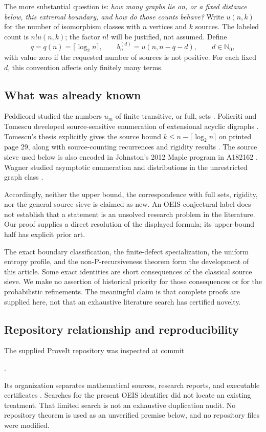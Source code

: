 \documentclass[11pt,a4paper]{article}
\theoremstyle{definition}
\newcommand{\N}{\mathbb N}
\newcommand{\code}[1]{\texttt{\detokenize{#1}}}
\begin{document}
The more substantial question is: \emph{how many graphs lie on, or a
fixed distance below, this extremal boundary, and how do those counts
behave?} Write $u(n,k)$ for the number of isomorphism classes with $n$
vertices and $k$ sources. The labeled count is $n!u(n,k)$; the factor
$n!$ will be justified, not assumed. Define
\begin{equation}\label{sbd:eq:boundary-def}
 q=q(n)=\lceil\log_2n\rceil,
 \qquad b_n^{(d)}=u(n,n-q-d),\qquad d\in\N_0,
\end{equation}
with value zero if the requested number of sources is not positive.
For each fixed $d$, this convention affects only finitely many terms.

\subsection{What was already known}
Peddicord studied the numbers $u_m$ of finite transitive, or full, sets
\cite{peddicord,oeis1192}. Policriti and Tomescu developed source-sensitive
enumeration of extensional acyclic digraphs \cite{policriti}.
Tomescu's thesis explicitly gives the source bound
$k\le n-\lceil\log_2n\rceil$ on printed page 29, along with source-counting
recurrences and rigidity results \cite{tomescu}. The source sieve used
below is also encoded in Johnston's 2012 Maple program in A182162
\cite{oeis162}. Wagner studied asymptotic enumeration and distributions
in the unrestricted graph class \cite{wagner}.

Accordingly, neither the upper bound, the correspondence with full sets,
rigidity, nor the general source sieve is claimed as new. An OEIS
conjectural label does not establish that a statement is an unsolved
research problem in the literature. Our proof supplies a direct resolution
of the displayed formula; its upper-bound half has explicit prior art.

The exact boundary classification, the finite-defect specialization,
the uniform entropy profile, and the non-P-recursiveness theorem form
the development of this article. Some exact identities are short
consequences of the classical source sieve. We make no assertion of
historical priority for those consequences or for the probabilistic
refinements. The meaningful claim is that complete proofs are supplied
here, not that an exhaustive literature search has certified novelty.

\subsection{Repository relationship and reproducibility}
The supplied ProveIt repository was inspected at commit
\begin{center}
\small\code{6bf7f30d0352f7596e70928b3d4f304914075907}.
\end{center}
Its organization separates mathematical sources, research reports, and
executable certificates \cite{repo}. Searches for the present OEIS
identifier did not locate an existing treatment. That limited search is
not an exhaustive duplication audit. No repository theorem is used as an
unverified premise below, and no repository files were modified.
\end{document}
